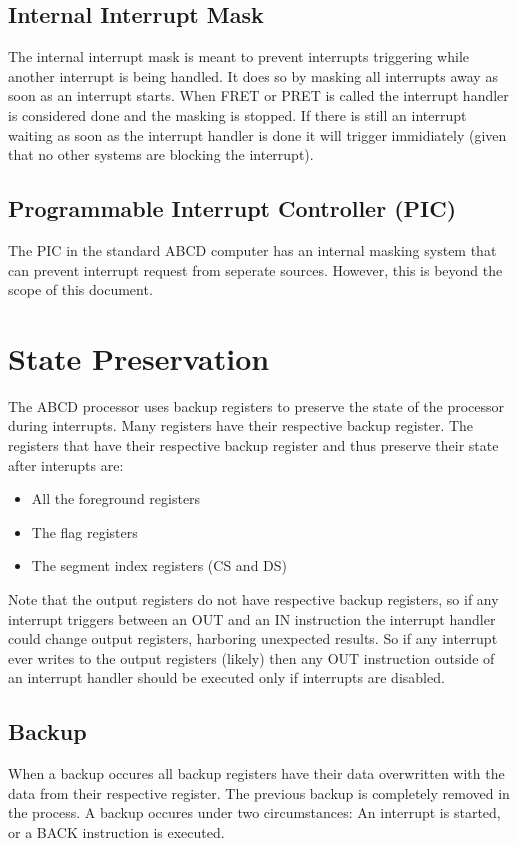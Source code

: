 \documentclass[oneside, a4paper]{memoir}
\begin{document}
\subsection{Internal Interrupt Mask}
The internal interrupt mask is meant to prevent interrupts triggering while another interrupt is being handled. It does so by masking all interrupts away as soon as an interrupt starts. When FRET or PRET is called the interrupt handler is considered done and the masking is stopped. If there is still an interrupt waiting as soon as the interrupt handler is done it will trigger immidiately (given that no other systems are blocking the interrupt).
\subsection{Programmable Interrupt Controller (PIC)}
The PIC in the standard ABCD computer has an internal masking system that can prevent interrupt request from seperate sources. However, this is beyond the scope of this document.
\section{State Preservation}
\label{sec:State Preservation}
The ABCD processor uses backup registers to preserve the state of the processor during interrupts. Many registers have their respective backup register. The registers that have their respective backup register and thus preserve their state after interupts are:
\begin{itemize}
\item All the foreground registers
\item The flag registers
\item The segment index registers (CS and DS)
\end{itemize}
Note that the output registers do not have respective backup registers, so if any interrupt triggers between an OUT and an IN instruction the interrupt handler could change output registers, harboring unexpected results. So if any interrupt ever writes to the output registers (likely) then any OUT instruction outside of an interrupt handler should be executed only if interrupts are disabled. 
\subsection{Backup}
\label{subsec:Backup}
When a backup occures all backup registers have their data overwritten with the data from their respective register. The previous backup is completely removed in the process. A backup occures under two circumstances: An interrupt is started, or a BACK instruction is executed.
\end{document}
